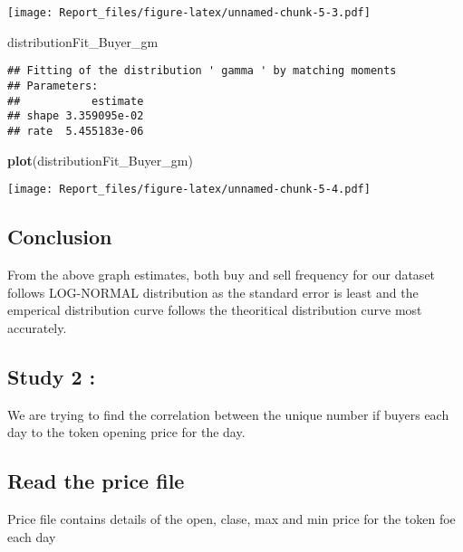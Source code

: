 \documentclass[]{article}
\newenvironment{Shaded}{\begin{snugshade}}{\end{snugshade}}
\newcommand{\KeywordTok}[1]{\textcolor[rgb]{0.13,0.29,0.53}{\textbf{#1}}}
\newcommand{\NormalTok}[1]{#1}
\begin{document}
\texttt{[image: Report\_files/figure-latex/unnamed-chunk-5-3.pdf]}

\begin{Shaded}
\begin{Highlighting}[]
\NormalTok{distributionFit_Buyer_gm}
\end{Highlighting}
\end{Shaded}

\begin{verbatim}
## Fitting of the distribution ' gamma ' by matching moments 
## Parameters:
##           estimate
## shape 3.359095e-02
## rate  5.455183e-06
\end{verbatim}

\begin{Shaded}
\begin{Highlighting}[]
\KeywordTok{plot}\NormalTok{(distributionFit_Buyer_gm)}
\end{Highlighting}
\end{Shaded}

\texttt{[image: Report\_files/figure-latex/unnamed-chunk-5-4.pdf]}

\subsection{Conclusion}\label{conclusion}

From the above graph estimates, both buy and sell frequency for our
dataset follows LOG-NORMAL distribution as the standard error is least
and the emperical distribution curve follows the theoritical
distribution curve most accurately.

\subsection{Study 2 :}\label{study-2}

We are trying to find the correlation between the unique number if
buyers each day to the token opening price for the day.

\subsection{Read the price file}\label{read-the-price-file}

Price file contains details of the open, clase, max and min price for
the token foe each day
\end{document}
